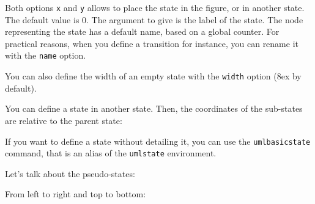 \documentclass[a4paper,11pt]{report}
\begin{document}
\medskip

Both options {\tt x} and {\tt y} allows to place the state in the figure, or in another state. 
The default value is 0. The argument to give is the label of the state. The node representing the state has a default name, based on a global counter. 
For practical reasons, when you define a transition for instance, you can rename it with the {\tt name} option.

\medskip

You can also define the width of an empty state with the  {\tt width} option (8ex by default).

\medskip

You can define a state in another state. Then, the coordinates of the sub-states are relative to the parent state:

\medskip

\begin{minipage}{0.51\textwidth}

\end{minipage}
\begin{minipage}{0.49\textwidth}
\begin{center}
\end{center}
\end{minipage}

\medskip

If you want to define a state without detailing it, you can use the {\tt umlbasicstate} command, that is an alias of the {\tt umlstate} environment.

\medskip

Let's talk about the pseudo-states:

\medskip

\begin{minipage}{0.51\textwidth}

\end{minipage}
\begin{minipage}{0.49\textwidth}
\begin{center}
\end{center}
\end{minipage}

\medskip

From left to right and top to bottom:

\medskip
\end{document}
